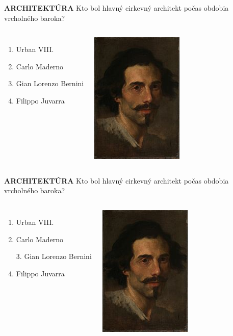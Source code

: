 \documentclass[dvipsnames]{beamer}
\begin{document}
\begin{frame}
	\textbf{ARCHITEKTÚRA}
	\vskip 3mm
	Kto bol hlavný cirkevný architekt počas obdobia vrcholného baroka?
	\begin{columns}
		\begin{enumerate}
			\item Urban VIII.
			\item Carlo Maderno
			\item Gian Lorenzo Bernini
			\item Filippo Juvarra
		\end{enumerate}
		\includegraphics[scale=1]{bern}

	\end{columns}
\end{frame}
\begin{frame}
	\textbf{ARCHITEKTÚRA}
	\vskip 3mm
	Kto bol hlavný cirkevný architekt počas obdobia vrcholného baroka?
	\begin{columns}
		\column{0.5\textwidth}
		\begin{enumerate}
			\item Urban VIII.
			\item Carlo Maderno
			\item[\textcolor{g}{3.}] \textcolor{g}{Gian Lorenzo Bernini}\setcounter{enumi}{3}
			\item Filippo Juvarra
		\end{enumerate}
		\column{0.5\textwidth}
		\includegraphics[scale=1]{bern}

	\end{columns}
\end{frame}
\end{document}
